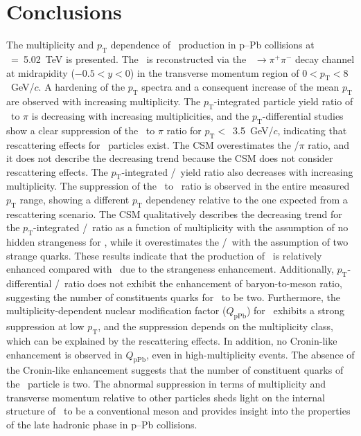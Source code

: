 
\section{Conclusions}
\label{sec:summary}

The multiplicity and $p_{\mathrm{T}}$ dependence of \fzero~production in p--Pb collisions at \snn~=~5.02~TeV is presented. The \fzero~is reconstructed via the \fzero~$\rightarrow\pi^{+}\pi^{-}$ decay channel at midrapidity ($-0.5<y<0$) in the transverse momentum region of $0<p_{\mathrm{T}}<8$~GeV/$c$. A hardening of the $p_{\mathrm{T}}$ spectra and a consequent increase of the mean $p_{\mathrm{T}}$ are observed with increasing multiplicity. The $p_{\mathrm{T}}$-integrated particle yield ratio of \fzero~to $\pi$ is decreasing with increasing multiplicities, and the $p_{\mathrm{T}}$-differential studies show a clear suppression of the \fzero~to $\pi$ ratio for $p_{\mathrm{T}}<$~3.5~GeV/$c$, indicating that rescattering effects for \fzero~particles exist. The CSM overestimates the \fzero/$\pi$ ratio, and it does not describe the decreasing trend because the CSM does not consider rescattering effects. The $p_{\mathrm{T}}$-integrated \fzero/\kstar~yield ratio also decreases with increasing multiplicity. The suppression of the \fzero~to \kstar~ratio is observed in the entire measured $p_{\mathrm{T}}$ range, showing a different $p_{\mathrm{T}}$ dependency relative to the one expected from a rescattering scenario. The CSM qualitatively describes the decreasing trend for the $p_{\mathrm{T}}$-integrated \fzero/\kstar~ratio as a function of multiplicity with the assumption of no hidden strangeness for \fzero, while it overestimates the \fzero/\kstar~with the assumption of two strange quarks. These results indicate that the production of \kstar~is relatively enhanced compared with \fzero~due to the strangeness enhancement. Additionally, $p_{\mathrm{T}}$-differential \fzero/\kstar~ratio does not exhibit the enhancement of baryon-to-meson ratio, suggesting the number of constituents quarks for \fzero~to be two. Furthermore, the multiplicity-dependent nuclear modification factor ($Q_{\mbox{pPb}}$) for \fzero~exhibits a strong suppression at low $p_{\mathrm{T}}$, and the suppression depends on the multiplicity class, which can be explained by the rescattering effects. In addition, no Cronin-like enhancement is observed in $Q_{\mbox{pPb}}$, even in high-multiplicity events. The absence of the Cronin-like enhancement suggests that the number of constituent quarks of the \fzero~particle is two. The abnormal suppression in terms of multiplicity and transverse momentum relative to other particles sheds light on the internal structure of \fzero~to be a conventional meson and provides insight into the properties of the late hadronic phase in p–Pb collisions.
